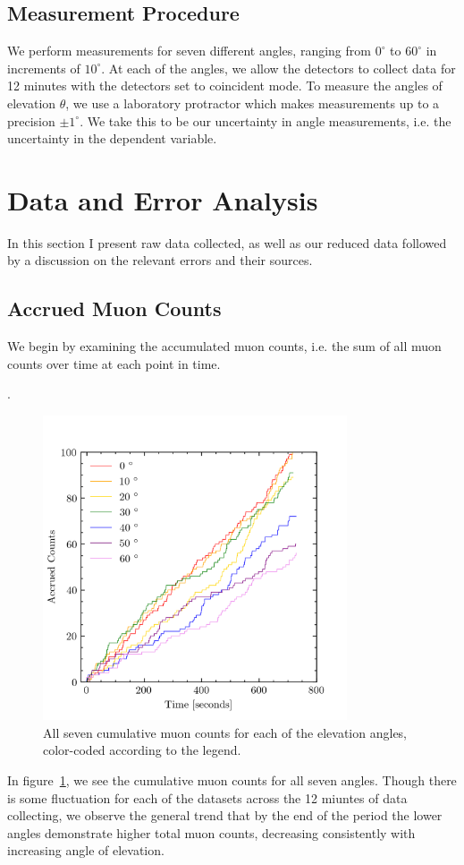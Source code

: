 \documentclass[aps,twocolumn,secnumarabic,balancelastpage,amsmath,amssymb,nofootinbib, floatfix]{revtex4-2}
\begin{document}
	\subsection{Measurement Procedure}
	
	We perform measurements for seven different angles, ranging from $0^{\circ}$ to $60^{\circ}$ in increments of $10^{\circ}$. At each of the angles, we allow the detectors to collect data for 12 minutes with the detectors set to coincident mode. To measure the angles of elevation $\theta$, we use a laboratory protractor which makes measurements up to a precision $\pm 1^{\circ}$. We take this to be our uncertainty in angle measurements, i.e. the uncertainty in the dependent variable. 

	\section{Data and Error Analysis}
	
	
	In this section I present raw data collected, as well as our reduced data followed by a discussion on the relevant errors and their sources. 
	
	\subsection{Accrued Muon Counts}
	
	We begin by examining the accumulated muon counts, i.e. the sum of all muon counts over time at each point in time. 
	 
. 	\begin{figure}[H]
		\centering
		\includegraphics[width=9cm]{cum_sum_all.png}
		\caption{All seven cumulative muon counts for each of the elevation angles, color-coded according to the legend.}
		\label{fig:all_cumsum}
	\end{figure}
	In figure~\ref{fig:all_cumsum}, we see the cumulative muon counts for all seven angles. Though there is some fluctuation for each of the datasets across the 12 miuntes of data collecting, we observe the general trend that by the end of the period the lower angles demonstrate higher total muon counts, decreasing consistently with increasing angle of elevation. 
	
\end{document}
